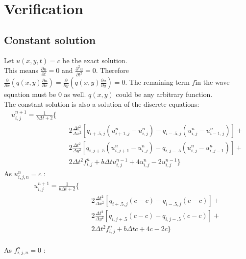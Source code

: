 \documentclass{report}
\begin{document}
        
        \chapter*{Verification}
        
        \section*{Constant solution}
        Let $u(x, y, t) = c$ be the exact solution. \\ This means $\frac{\partial u}{\partial t}=0$ and $\frac{\partial^2 u}{\partial t^2}=0$.
        Therefore $\frac{\partial}{\partial x}(q(x, y)\frac{\partial u}{\partial x})=\frac{\partial}{\partial y}(q(x, y)\frac{\partial u}{\partial y})=0$. The remaining term $f$in the wave equation must be $0$ as well. $q(x,y)$ could be any arbitrary function.
        \\The constant solution is also a solution of the discrete equations:\\
        \begin{equation}
        \begin{split}
        u^{n+1}_{i,j}= \frac{1}{b \Delta t + 2} \{\\  
        &\quad 2 \frac{\Delta t^2}{\Delta x^2}[q_{i+.5,j}(u^{n}_{i+1,j}-u^{n}_{i,j})-q_{i-.5,j}(u^{n}_{i,j}-u^{n}_{i-1,j})] + \\
        &\quad 2 \frac{\Delta t^2}{\Delta y^2}[q_{i,j+.5}(u^{n}_{i,j+1}-u^{n}_{i,j})-q_{i,j-.5}(u^{n}_{i,j}-u^{n}_{i,j-1})]+ \\
        &\quad  2\Delta t^2 f^{n}_{i,j} + b \Delta t u^{n-1}_{i,j}+4 u^{n}_{i,j}-2u^{n-1}_{i,j} \}
        \end{split}
        \end{equation}
        As $u^{n}_{i,j,n}=c$ :
        \begin{equation}
        \begin{split}
        u^{n+1}_{i,j} = \frac{1}{b \Delta t + 2} \{\\ 
        &\quad  2 \frac{\Delta t^2}{\Delta x^2}[q_{i+.5,j}(c-c)-q_{i-.5,j}(c-c)] + \\
        &\quad  2 \frac{\Delta t^2}{\Delta y^2}[q_{i,j+.5}(c-c)-q_{i,j-.5}(c-c)]+ \\
        &\quad  2\Delta t^2 f^{n}_{i,j} + b \Delta t c+4 c-2c \}
        \end{split}
        \end{equation}
        \\As $f^{n}_{i,j,n}=0$ :\\
\end{document}

